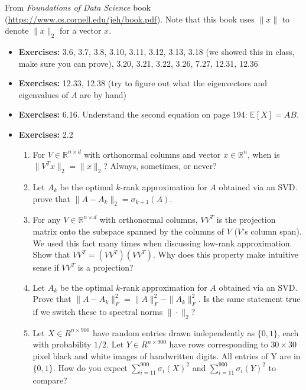\documentclass[10pt]{article}
\newcommand{\R}{\mathbb{R}}
\newcommand{\E}{\mathbb{E}}
\begin{document}
From \emph{Foundations of Data Science} book (\url{https://www.cs.cornell.edu/jeh/book.pdf}). Note that this book uses $\|x\|$ to denote $\|x\|_2$ for a vector $x$.
\begin{itemize}
	\item \textbf{Exercises:} 3.6, 3.7, 3.8, 3.10, 3.11, 3.12, 3.13, 3.18 (we showed this in class, make sure you can prove), 3.20, 3.21, 3.22, 3.26, 7.27, 12.31, 12.36
	\item \textbf{Exercises:} 12.33, 12.38 (try to figure out what the eigenvectors and eigenvalues of $A$ are by hand)
	\item \textbf{Exercises:} 6.16. Understand the second equation on page 194: $\E[X] = AB$.
	\item \textbf{Exercises:} 2.2
	\begin{enumerate}
		\item For $V \in \R^{n\times d}$ with orthonormal columns and vector $x \in \R^n$, when is $\|V^Tx\|_2 = \|x\|_2$? Always, sometimes, or never?
		\item Let ${A}_k$ be the optimal $k$-rank approximation for ${A}$ obtained via an SVD. prove that $\|A - A_k\|_2 = \sigma_{k+1}(A)$. 
		\item For any $V \in \R^{n\times d}$ with orthonormal columns, $VV^T$ is the projection matrix onto the subspace spanned by the columns of $V$ ($V$’s column span). We used this fact many times when discussing low-rank approximation. Show that $VV^T = (VV^T)(VV^T)$. Why does this property make intuitive sense if $VV^T$ is a projection?
		\item Let ${A}_k$ be the optimal $k$-rank approximation for ${A}$ obtained via an SVD.  Prove that $\|A - A_k\|_F^2 = \|A\|_F^2 - \|A_k\|_F^2$. Is the same statement true if we switch these to spectral norms $\|\cdot\|_2$? 
		\item Let $X \in R^{n\times 900}$ have random entries drawn independently as $\{0,1\}$, each with probability $1/2$. Let $Y \in R^{n\times 900}$ have
		rows corresponding to $30 \times 30$ pixel black and white images of handwritten digits. All entries
		of Y are in $\{0,1\}$. How do you expect $\sum_{i=11}^{900} \sigma_i(X)^2$ and $\sum_{i=11}^{900} \sigma_i(Y)^2$ to compare?

\end{enumerate}
\end{itemize}
\end{document}
